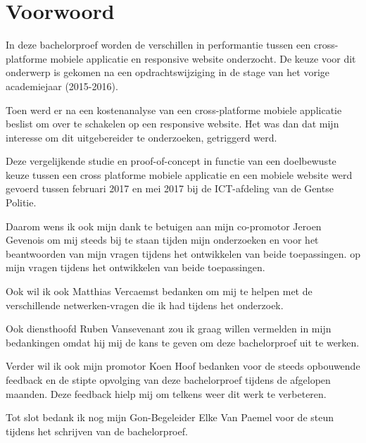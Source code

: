 
\chapter*{Voorwoord}
\label{ch:voorwoord}


In deze bachelorproef worden de verschillen in performantie tussen een cross-platforme mobiele applicatie en responsive website onderzocht.
De keuze voor dit onderwerp is gekomen na een opdrachtswijziging in de stage van het vorige academiejaar (2015-2016).

Toen werd er na een kostenanalyse van een cross-platforme mobiele applicatie beslist om over te schakelen op een responsive website.
Het was dan dat mijn interesse om dit uitgebereider te onderzoeken, getriggerd werd.

Deze vergelijkende studie en proof-of-concept in functie van een doelbewuste keuze tussen een cross platforme mobiele applicatie en
een mobiele website werd gevoerd tussen februari 2017 en mei 2017 bij de ICT-afdeling van de Gentse Politie.

Daarom wens ik ook mijn dank te betuigen aan mijn co-promotor Jeroen Gevenois om mij steeds bij te staan tijden mijn onderzoeken en voor
het beantwoorden van mijn vragen tijdens het ontwikkelen van beide toepassingen.
op mijn vragen tijdens het ontwikkelen van beide toepassingen.

Ook wil ik ook Matthias Vercaemst bedanken om mij te helpen met de verschillende netwerken-vragen die ik had tijdens het onderzoek.

Ook diensthoofd Ruben Vansevenant zou ik graag willen vermelden in mijn bedankingen omdat hij mij de kans te geven om deze bachelorproef uit te werken.

Verder wil ik ook mijn promotor Koen Hoof bedanken voor de steeds opbouwende feedback en de stipte opvolging van deze bachelorproef tijdens de afgelopen maanden.
Deze feedback hielp mij om telkens weer dit werk te verbeteren.

Tot slot bedank ik nog mijn Gon-Begeleider Elke Van Paemel voor de steun tijdens het schrijven van de bachelorproef.
